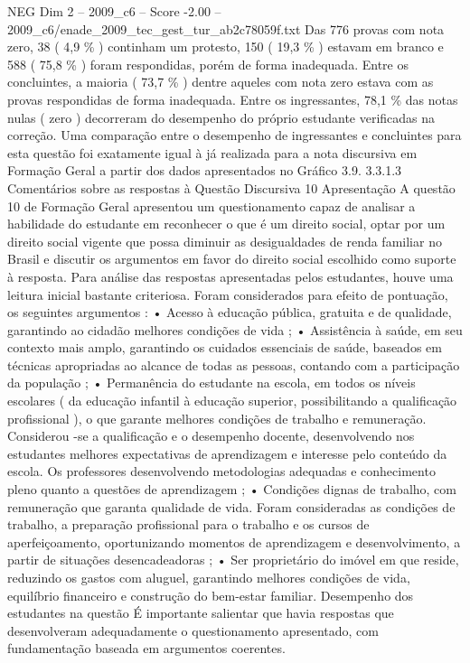 \begin{textsample}{NEG Dim 2 – 2009\_c6 – Score -2.00 – 2009\_c6/enade\_2009\_tec\_gest\_tur\_ab2c78059f.txt}
Das 776 provas com nota zero, 38 ( 4,9 \% ) continham um protesto, 150 ( 19,3 \% ) estavam em branco e 588 ( 75,8 \% ) foram respondidas, porém de forma inadequada.
Entre os concluintes, a maioria ( 73,7 \% ) dentre aqueles com nota zero estava com as provas respondidas de forma inadequada.
Entre os ingressantes, 78,1 \% das notas nulas ( zero ) decorreram do desempenho do próprio estudante verificadas na correção.
Uma comparação entre o desempenho de ingressantes e concluintes para esta questão foi exatamente igual à já realizada para a nota discursiva em Formação Geral a partir dos dados apresentados no Gráfico 3.9. 3.3.1.3 Comentários sobre as respostas à Questão Discursiva 10 Apresentação A questão 10 de Formação Geral apresentou um questionamento capaz de analisar a habilidade do estudante em reconhecer o que é um direito social, optar por um direito social vigente que possa diminuir as desigualdades de renda familiar no Brasil e discutir os argumentos em favor do direito social escolhido como suporte à resposta.
Para análise das respostas apresentadas pelos estudantes, houve uma leitura inicial bastante criteriosa.
Foram considerados para efeito de pontuação, os seguintes argumentos : • Acesso à educação pública, gratuita e de qualidade, garantindo ao cidadão melhores condições de vida ; • Assistência à saúde, em seu contexto mais amplo, garantindo os cuidados essenciais de saúde, baseados em técnicas apropriadas ao alcance de todas as pessoas, contando com a participação da população ; • Permanência do estudante na escola, em todos os níveis escolares ( da educação infantil à educação superior, possibilitando a qualificação profissional ), o que garante melhores condições de trabalho e remuneração.
Considerou -se a qualificação e o desempenho docente, desenvolvendo nos estudantes melhores expectativas de aprendizagem e interesse pelo conteúdo da escola.
Os professores desenvolvendo metodologias adequadas e conhecimento pleno quanto a questões de aprendizagem ; • Condições dignas de trabalho, com remuneração que garanta qualidade de vida.
Foram consideradas as condições de trabalho, a preparação profissional para o trabalho e os cursos de aperfeiçoamento, oportunizando momentos de aprendizagem e desenvolvimento, a partir de situações desencadeadoras ; • Ser proprietário do imóvel em que reside, reduzindo os gastos com aluguel, garantindo melhores condições de vida, equilíbrio financeiro e construção do bem-estar familiar.
Desempenho dos estudantes na questão É importante salientar que havia respostas que desenvolveram adequadamente o questionamento apresentado, com fundamentação baseada em argumentos coerentes.

\end{textsample}
